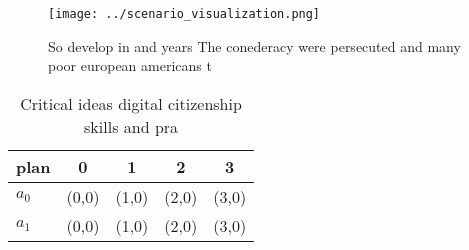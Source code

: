 \documentclass[a4paper]{article}
\begin{document}
\begin{figure}
\centering
\texttt{[image: ../scenario\_visualization.png]}
\caption{So develop in and years The conederacy were persecuted and many poor european americans t
}
\end{figure}
 
\begin{table}
\begin{adjustbox}{width=0.7\columnwidth}
\begin{tabular}{|l|l|l|l|l|}
\hline
\textbf{plan} & \multicolumn{1}{c|}{\textbf{0}} & \multicolumn{1}{c|}{\textbf{1}} & \multicolumn{1}{c|}{\textbf{2}} & \multicolumn{1}{c|}{\textbf{3}} \\ \hline
\textbf{$a_0$}  & (0,0) & (1,0) & (2,0) & (3,0) \\ \hline
\textbf{$a_1$}  & (0,0) & (1,0) & (2,0) & (3,0) \\ \hline
\end{tabular}
\end{adjustbox}
\caption{Critical ideas digital citizenship skills and pra
}
\end{table}
\end{document}
